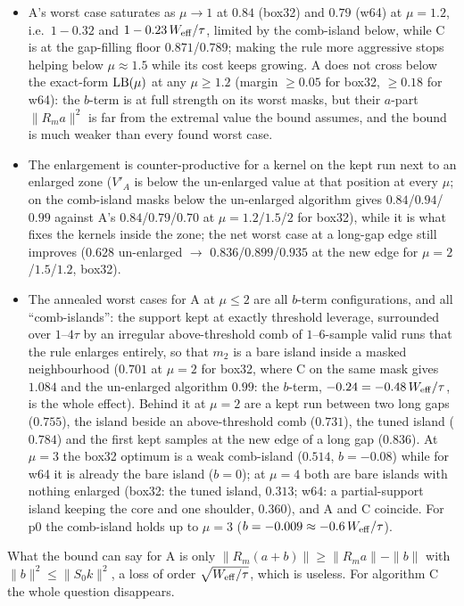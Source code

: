 \documentclass{article}
\numberwithin{equation}{section}   %
\begin{document}
\begin{itemize}
\item A's worst case saturates as $\mu \rightarrow 1$ at $0.84$ (box32) and $0.79$ (w64) at $\mu = 1.2$,
i.e.\ $1 - 0.32$ and $1 - 0.23\,W_{\rm eff}/\tau$, limited by the comb-island below, while C is at the
gap-filling floor $0.871$/$0.789$; making the rule more aggressive stops helping below $\mu \approx 1.5$
while its cost keeps growing.  A does not cross below the exact-form ${\rm LB}(\mu)$ at any
$\mu \ge 1.2$ (margin $\ge 0.05$ for box32, $\ge 0.18$ for w64): the $b$-term is at full strength on its
worst masks, but their $a$-part $\|R_ma\|^2$ is far from the extremal value the bound assumes, and the
bound is much weaker than every found worst case.
\item The enlargement is counter-productive for a kernel on the kept run next to an enlarged zone
($V'_A$ is below the un-enlarged value at that position at every $\mu$; on the comb-island masks below
the un-enlarged algorithm gives $0.84$/$0.94$/$0.99$ against A's $0.84$/$0.79$/$0.70$ at
$\mu = 1.2$/$1.5$/$2$ for box32), while it is what fixes the kernels inside the zone; the net worst case
at a long-gap edge still improves ($0.628$ un-enlarged $\rightarrow$ $0.836$/$0.899$/$0.935$ at the new
edge for $\mu = 2$/$1.5$/$1.2$, box32).
\item The annealed worst cases for A at $\mu \le 2$ are all $b$-term configurations, and all
``comb-islands'': the support kept at exactly threshold leverage, surrounded over $1$--$4\tau$ by an
irregular above-threshold comb of $1$--$6$-sample valid runs that the rule enlarges entirely, so that
$m_2$ is a bare island inside a masked neighbourhood ($0.701$ at $\mu = 2$ for box32, where C on the same
mask gives $1.084$ and the un-enlarged algorithm $0.99$: the $b$-term, $-0.24 = -0.48\,W_{\rm eff}/\tau$,
is the whole effect).  Behind it at $\mu = 2$ are a kept run between two long gaps ($0.755$), the island
beside an above-threshold comb ($0.731$), the tuned island ($0.784$) and the first kept samples at the
new edge of a long gap ($0.836$).  At $\mu = 3$ the box32 optimum is a weak comb-island ($0.514$,
$b = -0.08$) while for w64 it is already the bare island ($b = 0$); at $\mu = 4$ both are bare islands
with nothing enlarged (box32: the tuned island, $0.313$; w64: a partial-support island keeping the core
and one shoulder, $0.360$), and A and C coincide.  For p0 the comb-island holds up to $\mu = 3$
($b = -0.009 \approx -0.6\,W_{\rm eff}/\tau$).
\end{itemize}
What the bound can say for A is only $\|R_m(a + b)\| \ge \|R_ma\| - \|b\|$ with $\|b\|^2 \le \|S_0k\|^2$, a loss
of order $\sqrt{W_{\rm eff}/\tau}$, which is useless.  For algorithm C the whole question disappears.
\end{document}
